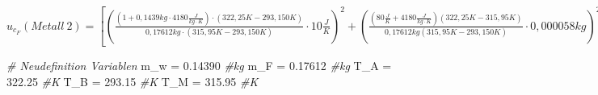 \documentclass[
  9pt,
]{article}
\newenvironment{Shaded}{\begin{snugshade}}{\end{snugshade}}
\newcommand{\CommentTok}[1]{\textcolor[rgb]{0.56,0.35,0.01}{\textit{#1}}}
\newcommand{\FloatTok}[1]{\textcolor[rgb]{0.00,0.00,0.81}{#1}}
\newcommand{\NormalTok}[1]{#1}
\newcommand{\OtherTok}[1]{\textcolor[rgb]{0.56,0.35,0.01}{#1}}
\begin{document}
\(u_{c_F}(Metall\ 2)=[(\frac{(1+0,1439kg\cdot 4180\frac{J}{kg\cdot K})\cdot (322,25K-293,150K)}{0,17612kg\cdot (315,95K-293,150K)}\cdot 10\frac{J}{K})^2+(\frac{(80\frac{J}{K}+4180\frac{J}{kg\cdot K})(322,25K-315,95K)}{0,17612kg (315,95K-293,150K)}\cdot 0,000058kg)^2+(\frac{(80\frac{J}{K}+0,1439kg\cdot 4180\frac{J}{kg\cdot K})\cdot (322,25K-1)}{0,17612kg(1-293,150K)}\cdot 0,029K)^2+(\frac{(80\frac{J}{K}+0,1439kg\cdot 4180\frac{J}{kg\cdot K})\cdot (322,25K-315,95K)}{0,17612kg (315,95K-1)}\cdot 0,029K)^2+(\frac{(80\frac{J}{K}+0,1439kg\cdot 4180\frac{J}{kg\cdot K})\cdot (322,25K-315,95K)}{315,95K-293,150K}\cdot 0,000029kg)^2+(\frac{(80\frac{J}{K}+0,1439kg\cdot 4180\frac{J}{kg\cdot K})\cdot (1-315,95K) }{0,17612kg(315,95K-293,150K)}\cdot 0,029K)^2]^{\frac{1}{2}} \approx 9600 \frac{J}{kg \cdot K}\)

\begin{Shaded}
\begin{Highlighting}[]
\CommentTok{\# Neudefinition Variablen}
\NormalTok{m\_w }\OtherTok{=} \FloatTok{0.14390} \CommentTok{\#kg}
\NormalTok{m\_F }\OtherTok{=} \FloatTok{0.17612} \CommentTok{\#kg}
\NormalTok{T\_A }\OtherTok{=} \FloatTok{322.25} \CommentTok{\#K}
\NormalTok{T\_B }\OtherTok{=} \FloatTok{293.15} \CommentTok{\#K}
\NormalTok{T\_M }\OtherTok{=} \FloatTok{315.95} \CommentTok{\#K}


\end{Highlighting}
\end{Shaded}
\end{document}
